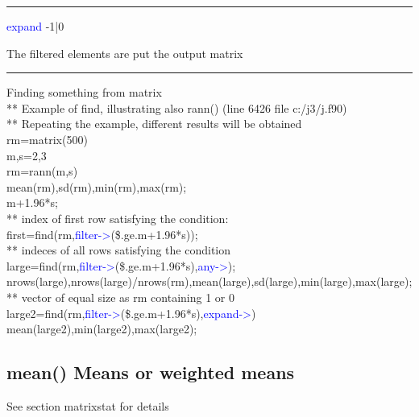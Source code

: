 \vspace{0.3cm}
\hrule
\vspace{0.3cm}
\noindent \textcolor{blue}{expand} \tabto{3cm} -1|0 \tabto{5cm}   \tabto{7cm}
\begin{changemargin}{3cm}{0cm}
\noindent  The filtered elements are put the output matrix
\end {changemargin}
\hrule
\vspace{0.2cm}
\begin{example}[findex]Finding something from matrix\\
\label{findex}
** Example of find, illustrating also \textcolor{VioletRed}{rann}() (line   6426 file c:/j3/j.f90)\\
** Repeating the example, different results will be obtained\\
rm=\textcolor{VioletRed}{matrix}(500)\\
m,s=2,3\\
rm=\textcolor{VioletRed}{rann}(m,s)\\
\textcolor{VioletRed}{mean}(rm),\textcolor{VioletRed}{sd}(rm),\textcolor{VioletRed}{min}(rm),\textcolor{VioletRed}{max}(rm);\\
m+1.96*s;\\
** index of first row satisfying the condition:\\
first=\textcolor{VioletRed}{find}(rm,\textcolor{blue}{filter->}(\$.ge.m+1.96*s));\\
** indeces of all rows satisfying the condition\\
large=\textcolor{VioletRed}{find}(rm,\textcolor{blue}{filter->}(\$.ge.m+1.96*s),\textcolor{blue}{any->});\\
\textcolor{VioletRed}{nrows}(large),\textcolor{VioletRed}{nrows}(large)/\textcolor{VioletRed}{nrows}(rm),\textcolor{VioletRed}{mean}(large),\textcolor{VioletRed}{sd}(large),\textcolor{VioletRed}{min}(large),\textcolor{VioletRed}{max}(large);\\
** vector of equal size as rm containing 1 or 0\\
large2=\textcolor{VioletRed}{find}(rm,\textcolor{blue}{filter->}(\$.ge.m+1.96*s),\textcolor{blue}{expand->})\\
\textcolor{VioletRed}{mean}(large2),\textcolor{VioletRed}{min}(large2),\textcolor{VioletRed}{max}(large2);
\end{example}
\subsection{\textcolor{VioletRed}{mean}() Means or weighted means}
\label{mean}
See section matrixstat for details

